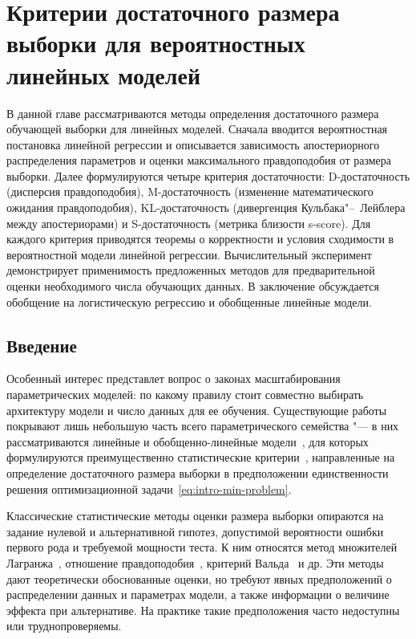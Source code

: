 \chapter{Критерии достаточного размера выборки для вероятностных линейных моделей}\label{ch:linear}

В данной главе рассматриваются методы определения достаточного размера обучающей выборки для линейных моделей. Сначала вводится вероятностная постановка линейной регрессии и описывается зависимость апостериорного распределения параметров и оценки максимального правдоподобия от размера выборки. Далее формулируются четыре критерия достаточности: D-достаточность (дисперсия правдоподобия), M-достаточность (изменение математического ожидания правдоподобия), KL-достаточность (дивергенция Кульбака"--~Лейблера между апостериорами) и S-достаточность (метрика близости s-score). Для каждого критерия приводятся теоремы о корректности и условия сходимости в вероятностной модели линейной регрессии. Вычислительный эксперимент демонстрирует применимость предложенных методов для предварительной оценки необходимого числа обучающих данных. В заключение обсуждается обобщение на логистическую регрессию и обобщенные линейные модели.

\section{Введение}

Особенный интерес представлет вопрос о законах масштабирования параметрических моделей: по какому правилу стоит совместно выбирать архитектуру модели и число данных для ее обучения. Существующие работы покрывают лишь небольшую часть всего параметрического семейства "--- в них рассматриваются линейные и обобщенно-линейные модели~, для которых формулируются преимущественно статистические критерии~, направленные на определение достаточного размера выборки в предположении единственности решения оптимизационной задачи~\eqref{eq:intro-min-problem}.

Классические статистические методы оценки размера выборки опираются на задание нулевой и альтернативной гипотез, допустимой вероятности ошибки первого рода и требуемой мощности теста. К ним относятся метод множителей Лагранжа~, отношение правдоподобия~, критерий Вальда~ и др. Эти методы дают теоретически обоснованные оценки, но требуют явных предположений о распределении данных и параметрах модели, а также информации о величине эффекта при альтернативе. На практике такие предположения часто недоступны или труднопроверяемы.

